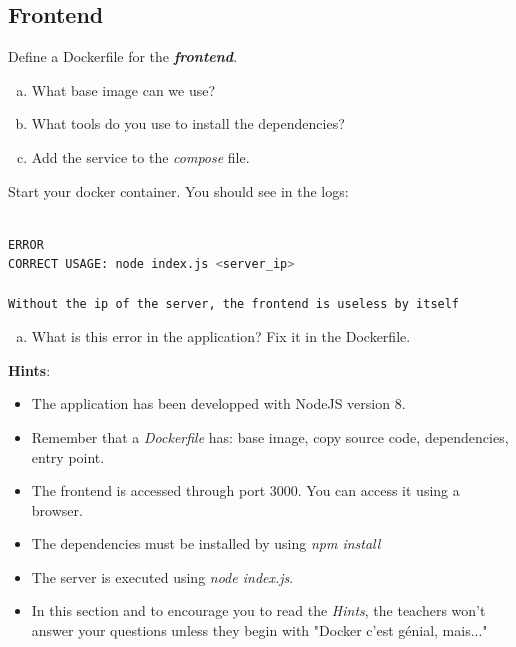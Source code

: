\documentclass[a4paper,11pt]{exam}
\begin{document}
\subsection{Frontend}
\begin{questions}
	\question Define a Dockerfile for the \textit{\textbf{frontend}}.
	\begin{enumerate}[(a)]
		\item What base image can we use?
		\item What tools do you use to install the dependencies?
		\item Add the service to the \textit{compose} file.
	\end{enumerate}
Start your docker container. You should see in the logs: 
\begin{lstlisting}[frame=single,language={sh}]  % Start your code-block

ERROR
CORRECT USAGE: node index.js <server_ip>

Without the ip of the server, the frontend is useless by itself	
\end{lstlisting}
\begin{enumerate}[(d)]
		\item What is this error in the application? Fix it in the Dockerfile.
\end{enumerate}
	
	\textbf{Hints}:
	\begin{itemize}
		\item The application has been developped with NodeJS version 8.
		\item Remember that a \textit{Dockerfile} has: base image, copy source code, dependencies, entry point.
		\item The frontend is accessed through port 3000. You can access it using a browser.
		\item The dependencies must be installed by using \textit{npm install} 
		\item The server is executed using \textit{node index.js}.
		\item In this section and to encourage you to read the \textit{Hints}, the teachers won't answer your questions unless they begin with "Docker c'est génial, mais..."
	\end{itemize}
	\end{questions}
\end{document}
